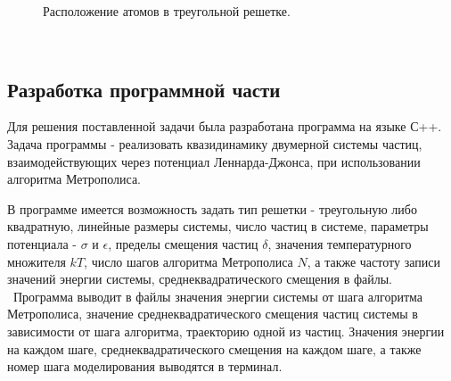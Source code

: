 \documentclass[14pt,a4paper,report]{ncc}
\begin{document}
{\begin{figure}[h]
\caption{Расположение атомов в треугольной решетке.}
\label{ris:image2}
\end{figure}
\
\subsection{Разработка программной части}
Для решения поставленной задачи была разработана программа на языке С++. Задача программы - реализовать квазидинамику двумерной системы частиц, взаимодействующих через потенциал Леннарда-Джонса, при использовании алгоритма Метрополиса.
\

В программе имеется возможность задать тип решетки - треугольную либо квадратную, линейные размеры системы, число частиц в системе, параметры потенциала - $\sigma$ и $\epsilon$, пределы смещения частиц $\delta$, значения температурного множителя $kT$, число шагов алгоритма Метрополиса $N$, а также частоту записи значений энергии системы, среднеквадратического смещения в файлы.
\
Программа выводит в файлы значения энергии системы от шага алгоритма Метрополиса, значение среднеквадратического смещения частиц системы в зависимости от шага алгоритма, траекторию одной из частиц. 
Значения энергии на каждом шаге, среднеквадратического смещения на каждом шаге, а также номер шага моделирования выводятся в терминал. 

\ 

}
\end{document}

